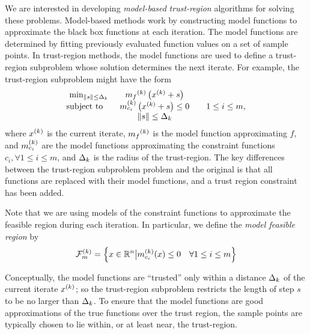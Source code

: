 We are interested in developing {\em model-based} {\em trust-region} algorithms for solving these problems.
Model-based methods work by constructing model functions to approximate the black box functions at each iteration.
The model functions are determined by fitting previously evaluated function values on a set of sample points.
In trust-region methods, the model functions are used to define a trust-region subproblem whose solution determines the next iterate.
For example, the trust-region subproblem might have the form
\begin{align*}
\begin{array}{ccl} \min_{\|s\| \le \Delta_k}
 & {{m}_f}^{(k)} \left(x^{(k)}+s\right) \\
\mbox{subject to} \quad & {{m}^{(k)}_{c_i}}\left(x^{(k)} + s\right) \le 0 & \quad 1 \le i \le m, \\
& \|s\| \le \Delta_k \\
\end{array}
\end{align*}
where $x^{(k)}$ is the current iterate, ${{m}_f}^{(k)}$ is the model function approximating $f$, 
and ${{m}^{(k)}_{c_i}}$ are the model functions approximating the constraint functions $c_i, \forall 1 \le i \le m$, and $\Delta_k$ is the radius of the trust-region.
The key differences between the trust-region subproblem problem and the original is that all functions are replaced with their model functions, and a trust region constraint has been added.

Note that we are using models of the constraint functions to approximate the feasible region during each iteration.  In particular, we define the {\em model feasible region} by
\begin{align}
{\mathcal F_m^{(k)}} = \left\{x \in \mathbb R^n \big| {{m}^{(k)}_{c_i}}(x) \le 0 \quad \forall 1 \le i \le m \right\}  \label{define_feasiblek}
\end{align}



Conceptually, the model functions are ``trusted'' only within a distance $ \Delta_k $ of the current iterate $x^{(k)}$; so the trust-region subproblem restricts the length of step $s$ to be no larger than $\Delta_k$.
To ensure that the model functions are good approximations of the true functions over the trust region, the sample points are typically chosen to lie within, or at least near, the trust-region.

